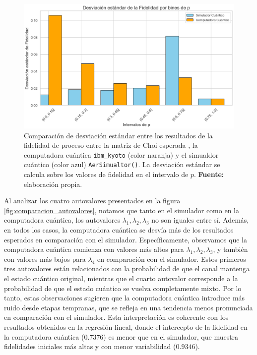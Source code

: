 \documentclass[letterpaper,12pt]{thesisECFM}
\theoremstyle{plain}
\theoremstyle{definition}
\theoremstyle{remark}
\newcommand{\1}{\mathbb{1}}
\begin{document}
\begin{figure}[h!]
    \centering
    \includegraphics[width=0.95\linewidth]{imagenes/Comparacion_desviaciones.png}
    \caption{Comparación de desviación estándar entre los resultados de la fidelidad de proceso entre la matriz de Choi esperada , la computadora cuántica \texttt{ibm\_kyoto} (color naranja) y el simualdor cuántico (color azul) \texttt{AerSimualtor()}. La desviación estándar se calcula sobre los valores de fidelidad en el intervalo de $p$. \textbf{Fuente:} elaboración propia.}
    \label{fig:comparacion_desviaciones}
\end{figure}


Al analizar los cuatro autovalores presentados en la figura \ref{fig:comparacion_autovalores}, notamos que tanto en el simulador como en la computadora cuántica, los autovalores $\lambda_1,\lambda_2,\lambda_3$ no son iguales entre sí. Además, en todos los casos, la computadora cuántica se desvía más de los resultados esperados en comparación con el simulador. Específicamente, observamos que la computadora cuántica comienza con valores más altos para $\lambda_1,\lambda_2,\lambda_3$, y también con valores más bajos para $\lambda_4$ en comparación con el simulador.
Estos primeros tres autovalores están relacionados con la probabilidad de que el canal mantenga el estado cuántico original, mientras que el cuarto autovalor corresponde a la probabilidad de que el estado cuántico se vuelva completamente mixto. Por lo tanto, estas observaciones sugieren que la computadora cuántica introduce más ruido desde etapas tempranas, que se refleja en una tendencia menos pronunciada en comparación con el simulador. Esta interpretación es coherente con los resultados obtenidos en la regresión lineal, donde el intercepto de la fidelidad en la computadora cuántica ($0.7376$) es menor que en el simulador, que muestra fidelidades iniciales más altas y con menor variabilidad ($0.9346$).
\end{document}
